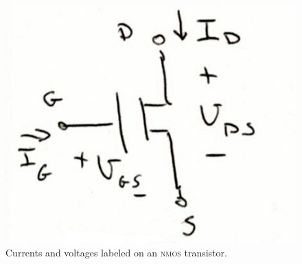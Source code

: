 \begin{figure}
  \centering
  \includegraphics[width=0.5\linewidth]{figures/NMOS-currents-voltages}
  \caption{Currents and voltages labeled on an \textsc{nmos} transistor.}
  \label{figure:lec2-NMOS}
\end{figure}

